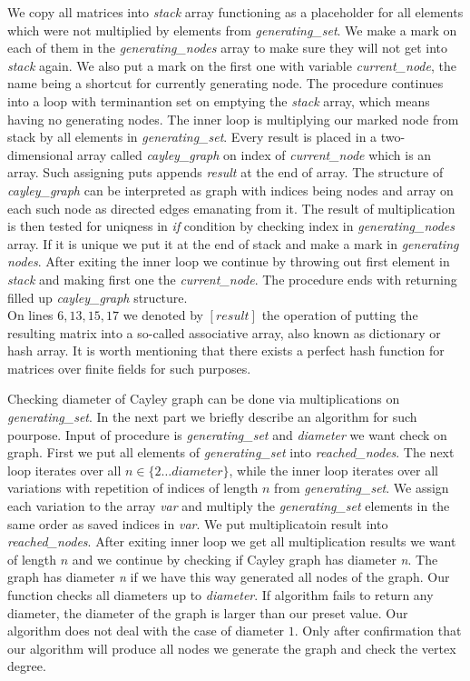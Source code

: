 \documentclass[a4paper,12pt,oneside]{report}%
\begin{document}
We copy all matrices into {\em stack} array functioning as a placeholder for all elements which were not multiplied by elements from {\em generating\_set}. We make a mark on each of them in the  {\em generating\_nodes} array to make sure they will not get into {\em stack} again. We also put a mark on the first one with variable {\em current\_node}, the name being a shortcut for currently generating node. The procedure continues into a loop with terminantion set on emptying the {\em stack} array, which means having no generating nodes. The inner loop is multiplying our marked node from stack by all elements in {\em generating\_set}. Every result is placed in a two-dimensional array called {\em cayley\_graph} on index of {\em current\_node} which is an array. Such assigning puts appends {\em result} at the end of array. The structure of {\em cayley\_graph} can be interpreted as graph with indices being nodes and array on each such node as directed edges emanating from it. The result of multiplication is then tested for uniqness in {\em if} condition by checking index in {\em generating\_nodes} array. If it is unique we put it at the end of stack and make a mark in {\em generating nodes}. After exiting the inner loop we continue by throwing out first element in {\em stack} and making first one the {\em current\_node}. The procedure ends with returning filled up {\em cayley\_graph} structure.  ~\\



On lines $6,13,15,17$ we denoted by $[ result ]$  the operation of putting the resulting matrix into a so-called associative array, also known as dictionary or hash array. It is worth mentioning that there exists a perfect hash function for matrices over finite fields for such purposes.

Checking diameter of Cayley graph can be done via multiplications on {\em generating\_set}. In the next part we briefly describe an algorithm for such pourpose. Input of procedure is {\em generating\_set} and {\em diameter} we want check on graph. First we put all elements of {\em generating\_set} into {\em reached\_nodes}. The next loop iterates over all $n \in \{2 \dots diameter\}$, while the inner loop iterates over all variations with repetition of indices of length $n$ from {\em generating\_set}. We assign each variation to the array {\em var} and multiply the {\em generating\_set} elements in the same order as saved indices in {\em var}. We put multiplicatoin result into {\em reached\_nodes}. After exiting inner loop we get all multiplication results we want of length $n$ and we continue by checking if Cayley graph has diameter {\em n}. The graph has diameter {\em n} if  we have this way generated  all nodes of the graph. Our function checks all diameters up to {\em diameter}. If algorithm fails to return any diameter, the diameter of the graph is larger than our preset value. Our algorithm does not deal with the case of diameter $1$. Only after confirmation that our algorithm will produce all nodes we generate the graph and check the vertex degree. ~\\
\end{document}
